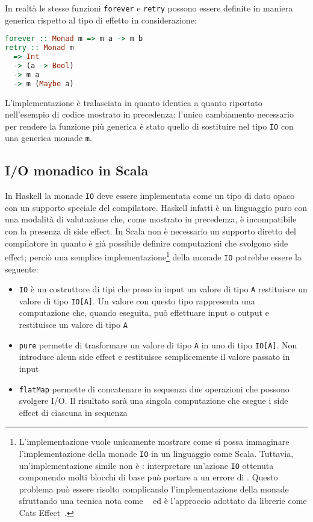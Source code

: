 In realtà le stesse funzioni \lstinline{forever} e \lstinline{retry} possono essere definite in maniera generica rispetto al tipo di effetto in considerazione:
\begin{lstlisting}[language=haskell]
forever :: Monad m => m a -> m b
retry :: Monad m
  => Int
  -> (a -> Bool)
  -> m a
  -> m (Maybe a)
\end{lstlisting}
L'implementazione è tralasciata in quanto identica a quanto riportato nell'esempio di codice mostrato in precedenza: l'unico cambiamento necessario per rendere la funzione più generica è stato quello di sostituire nel tipo \lstinline{IO} con una generica monade \lstinline{m}.

\subsection{I/O monadico in Scala}
In Haskell la monade \lstinline{IO} deve essere implementata come un tipo di dato opaco con un supporto speciale del compilatore. Haskell infatti è un linguaggio puro con una modalità di valutazione  che, come mostrato in precedenza, è incompatibile con la presenza di side effect.
In Scala non è necessario un supporto diretto del compilatore in quanto è già possibile definire computazioni che svolgono side effect; perciò una semplice implementazione\footnote{L'implementazione vuole unicamente mostrare come si possa immaginare l'implementazione della monade \lstinline{IO} in un linguaggio come Scala. Tuttavia, un'implementazione simile non è : interpretare un'azione \lstinline{IO} ottenuta componendo molti blocchi di base può portare a un errore di . Questo problema può essere risolto complicando l'implementazione della monade sfruttando una tecnica nota come ~\cite{cit:stackless-scala-with-free-monads} ed è l'approccio adottato da librerie come Cats Effect~\cite{cit:cats-effect-stack-safety}.} della monade \lstinline{IO} potrebbe essere la seguente:
\begin{itemize}
  \item \lstinline{IO} è un costruttore di tipi che preso in input un valore di tipo \lstinline{A} restituisce un valore di tipo \lstinline{IO[A]}. Un valore con questo tipo rappresenta una computazione che, quando eseguita, può effettuare input o output e restituisce un valore di tipo \lstinline{A}
  \item \lstinline{pure} permette di trasformare un valore di tipo \lstinline{A} in uno di tipo \lstinline{IO[A]}. Non introduce alcun side effect e restituisce semplicemente il valore passato in input
  \item \lstinline{flatMap} permette di concatenare in sequenza due operazioni che possono svolgere I/O. Il risultato sarà una singola computazione che esegue i side effect di ciascuna in sequenza
\end{itemize}


